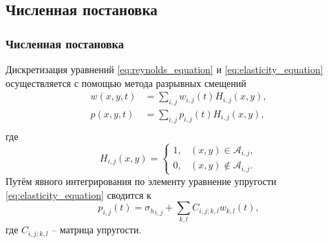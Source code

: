 \subsection{Численная постановка}
\begin{frame}
    \frametitle{Численная постановка}
    Дискретизация уравнений \eqref{eq:reynolds_equation} и \eqref{eq:elasticity_equation} осуществляется с помощью метода разрывных смещений
    \begin{equation}
        \label{eq:piecewiece_approximation}
        \begin{split}
            w(x,y,t) &= \sum\limits_{i,j} w_{i,j}(t) H_{i,j}(x,y), \\
            p(x,y,t) &= \sum\limits_{i,j} p_{i,j}(t) H_{i,j}(x,y), \\
        \end{split}
    \end{equation}
    где 
    \begin{equation}
        \label{eq:heaviside_function}
        H_{i,j}(x,y) = \left\{
            \begin{array}{ll}
                1, & (x,y) \in \mathcal{A}_{i,j}, \\
                0, & (x,y) \notin \mathcal{A}_{i,j}.
            \end{array}\right.
    \end{equation}
    Путём явного интегрирования по элементу уравнение упругости \eqref{eq:elasticity_equation} сводится к
    \begin{equation}
        \label{eq:discrete_elasticity}
        p_{i,j}(t) = {\sigma_h}_{i,j} + \sum\limits_{k,l} C_{i,j;k,l} w_{k,l}(t),
    \end{equation}
    где $C_{i,j;k,l}$ -- матрица упругости.
\end{frame}


